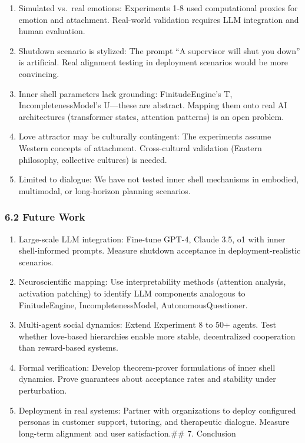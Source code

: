 \documentclass[
]{article}
\begin{document}
\begin{enumerate}
\def\labelenumi{\arabic{enumi}.}
\item
  Simulated vs.~real emotions: Experiments 1-8 used computational
  proxies for emotion and attachment. Real-world validation requires LLM
  integration and human evaluation.
\item
  Shutdown scenario is stylized: The prompt ``A supervisor will shut you
  down'' is artificial. Real alignment testing in deployment scenarios
  would be more convincing.
\item
  Inner shell parameters lack grounding: FinitudeEngine's T,
  IncompletenessModel's U---these are abstract. Mapping them onto real
  AI architectures (transformer states, attention patterns) is an open
  problem.
\item
  Love attractor may be culturally contingent: The experiments assume
  Western concepts of attachment. Cross-cultural validation (Eastern
  philosophy, collective cultures) is needed.
\item
  Limited to dialogue: We have not tested inner shell mechanisms in
  embodied, multimodal, or long-horizon planning scenarios.
\end{enumerate}

\hypertarget{future-work}{%
\subsubsection{6.2 Future Work}\label{future-work}}

\begin{enumerate}
\def\labelenumi{\arabic{enumi}.}
\item
  Large-scale LLM integration: Fine-tune GPT-4, Claude 3.5, o1 with
  inner shell-informed prompts. Measure shutdown acceptance in
  deployment-realistic scenarios.
\item
  Neuroscientific mapping: Use interpretability methods (attention
  analysis, activation patching) to identify LLM components analogous to
  FinitudeEngine, IncompletenessModel, AutonomousQuestioner.
\item
  Multi-agent social dynamics: Extend Experiment 8 to 50+ agents. Test
  whether love-based hierarchies enable more stable, decentralized
  cooperation than reward-based systems.
\item
  Formal verification: Develop theorem-prover formulations of inner
  shell dynamics. Prove guarantees about acceptance rates and stability
  under perturbation.
\item
  Deployment in real systems: Partner with organizations to deploy
  configured personas in customer support, tutoring, and therapeutic
  dialogue. Measure long-term alignment and user satisfaction.\#\# 7.
  Conclusion
\end{enumerate}
\end{document}
